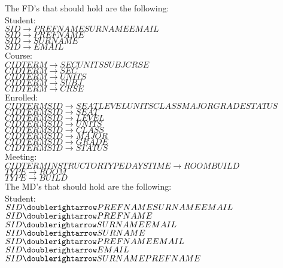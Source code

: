 
The FD's that should hold are the following:  \\

Student: \\
$SID \rightarrow PREFNAME SURNAME EMAIL  $ \\
$SID \rightarrow PREFNAME$ \\
$SID \rightarrow SURNAME$ \\
$SID \rightarrow EMAIL$ \\ 

Course: \\
$CID TERM \rightarrow SEC UNITS SUBJ CRSE$ \\
$CID TERM \rightarrow SEC$ \\
$CID TERM \rightarrow UNITS$ \\ 
$CID TERM \rightarrow SUBJ$ \\
$CID TERM \rightarrow CRSE$ \\

Enrolled: \\
$CID TERM SID \rightarrow SEAT LEVEL UNITS CLASS MAJOR GRADE STATUS$\\
$CID TERM SID \rightarrow SEAT$\\
$CID TERM SID \rightarrow LEVEL$\\
$CID TERM SID \rightarrow UNITS$\\
$CID TERM SID \rightarrow CLASS$\\
$CID TERM SID \rightarrow MAJOR$\\
$CID TERM SID \rightarrow GRADE$\\
$CID TERM SID \rightarrow STATUS$\\

Meeting: \\
$CID TERM INSTRUCTOR TYPE DAYS TIME \rightarrow ROOM BUILD$ \\
$TYPE \rightarrow ROOM$ \\
$TYPE \rightarrow BUILD$ \\



The MD's that should hold are the following: \\

Student: \\
$SID \doublerightarrow PREFNAME SURNAME EMAIL$ \\
$SID \doublerightarrow PREFNAME$ \\
$SID \doublerightarrow SURNAME EMAIL$ \\
$SID \doublerightarrow SURNAME$ \\
$SID \doublerightarrow PREFNAME EMAIL$ \\
$SID \doublerightarrow EMAIL$ \\ 
$SID \doublerightarrow SURNAME PREFNAME$ \\


